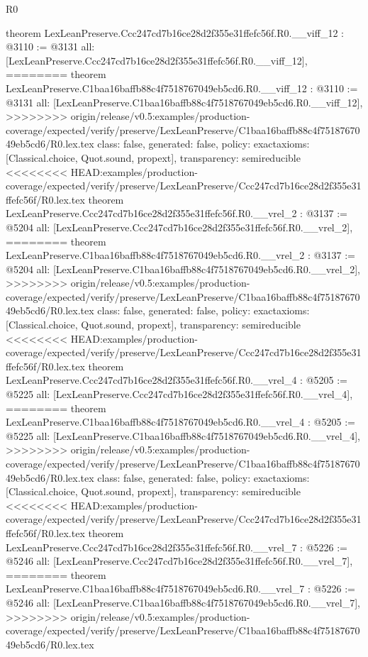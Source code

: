 \begin{lexlean}{R0}
\begin{coremodule}
{{{{{{{{{{{{{{{{{{{{{{{{{{{{{{{{{{{{{{{{{{{{{{{{{{{{{{{{{{{{{{{{{{theorem LexLeanPreserve.Ccc247cd7b16ce28d2f355e31ffefc56f.R0.__viff_12 : @3110 := @3131 {
  all: [LexLeanPreserve.Ccc247cd7b16ce28d2f355e31ffefc56f.R0.__viff_12],
========
theorem LexLeanPreserve.C1baa16baffb88c4f7518767049eb5cd6.R0.__viff_12 : @3110 := @3131 {
  all: [LexLeanPreserve.C1baa16baffb88c4f7518767049eb5cd6.R0.__viff_12],
>>>>>>>> origin/release/v0.5:examples/production-coverage/expected/verify/preserve/LexLeanPreserve/C1baa16baffb88c4f7518767049eb5cd6/R0.lex.tex
  class: false,
  generated: false,
  policy: exact{axioms: [Classical.choice, Quot.sound, propext]},
  transparency: semireducible
}
<<<<<<<< HEAD:examples/production-coverage/expected/verify/preserve/LexLeanPreserve/Ccc247cd7b16ce28d2f355e31ffefc56f/R0.lex.tex
theorem LexLeanPreserve.Ccc247cd7b16ce28d2f355e31ffefc56f.R0.__vrel_2 : @3137 := @5204 {
  all: [LexLeanPreserve.Ccc247cd7b16ce28d2f355e31ffefc56f.R0.__vrel_2],
========
theorem LexLeanPreserve.C1baa16baffb88c4f7518767049eb5cd6.R0.__vrel_2 : @3137 := @5204 {
  all: [LexLeanPreserve.C1baa16baffb88c4f7518767049eb5cd6.R0.__vrel_2],
>>>>>>>> origin/release/v0.5:examples/production-coverage/expected/verify/preserve/LexLeanPreserve/C1baa16baffb88c4f7518767049eb5cd6/R0.lex.tex
  class: false,
  generated: false,
  policy: exact{axioms: [Classical.choice, Quot.sound, propext]},
  transparency: semireducible
}
<<<<<<<< HEAD:examples/production-coverage/expected/verify/preserve/LexLeanPreserve/Ccc247cd7b16ce28d2f355e31ffefc56f/R0.lex.tex
theorem LexLeanPreserve.Ccc247cd7b16ce28d2f355e31ffefc56f.R0.__vrel_4 : @5205 := @5225 {
  all: [LexLeanPreserve.Ccc247cd7b16ce28d2f355e31ffefc56f.R0.__vrel_4],
========
theorem LexLeanPreserve.C1baa16baffb88c4f7518767049eb5cd6.R0.__vrel_4 : @5205 := @5225 {
  all: [LexLeanPreserve.C1baa16baffb88c4f7518767049eb5cd6.R0.__vrel_4],
>>>>>>>> origin/release/v0.5:examples/production-coverage/expected/verify/preserve/LexLeanPreserve/C1baa16baffb88c4f7518767049eb5cd6/R0.lex.tex
  class: false,
  generated: false,
  policy: exact{axioms: [Classical.choice, Quot.sound, propext]},
  transparency: semireducible
}
<<<<<<<< HEAD:examples/production-coverage/expected/verify/preserve/LexLeanPreserve/Ccc247cd7b16ce28d2f355e31ffefc56f/R0.lex.tex
theorem LexLeanPreserve.Ccc247cd7b16ce28d2f355e31ffefc56f.R0.__vrel_7 : @5226 := @5246 {
  all: [LexLeanPreserve.Ccc247cd7b16ce28d2f355e31ffefc56f.R0.__vrel_7],
========
theorem LexLeanPreserve.C1baa16baffb88c4f7518767049eb5cd6.R0.__vrel_7 : @5226 := @5246 {
  all: [LexLeanPreserve.C1baa16baffb88c4f7518767049eb5cd6.R0.__vrel_7],
>>>>>>>> origin/release/v0.5:examples/production-coverage/expected/verify/preserve/LexLeanPreserve/C1baa16baffb88c4f7518767049eb5cd6/R0.lex.tex
}}}}}}}}}}}}}}}}}}}}}}}}}}}}}}}}}}}}}}}}}}}}}}}}}}}}}}}}}}}}}}}}}}}}}}}
\end{coremodule}
\end{lexlean}
